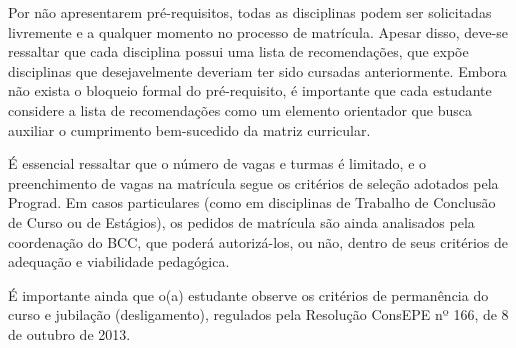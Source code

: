 Por não apresentarem pré-requisitos, todas as disciplinas podem ser solicitadas
livremente e a qualquer momento no processo de matrícula.
Apesar disso, deve-se ressaltar que cada disciplina possui uma lista de
recomendações, que expõe disciplinas que desejavelmente deveriam ter sido
cursadas anteriormente.
Embora não exista o bloqueio formal do pré-requisito, é importante que cada
estudante considere a lista de recomendações como um elemento orientador que
busca auxiliar o cumprimento bem-sucedido da matriz curricular.

É essencial ressaltar que o número de vagas e turmas é limitado, e o
preenchimento de vagas na matrícula segue os critérios de seleção adotados pela
Prograd.
Em casos particulares (como em disciplinas de Trabalho de Conclusão de Curso ou
de Estágios), os pedidos de matrícula são ainda analisados pela coordenação do
BCC, que poderá autorizá-los, ou não, dentro de seus critérios de adequação e
viabilidade pedagógica.

É importante ainda que o(a) estudante observe os critérios de permanência do
curso e jubilação (desligamento), regulados pela Resolução ConsEPE nº 166, de
8 de outubro de 2013.
